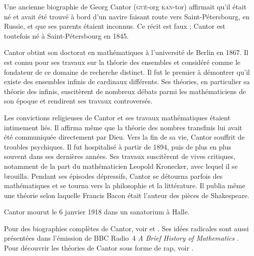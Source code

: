 \documentclass[../../../include/open-logic-section]{subfiles}
\begin{document}



Une ancienne biographie
de Georg Cantor
(\textsc{gué}-org
\textsc{kan}-tor)
affirmait qu'il
était né et
avait été trouvé
à bord d'un
navire faisant
route vers
Saint-Pétersbourg,
en Russie, et
que ses parents
étaient inconnus.
Ce récit est
faux ; Cantor
est toutefois
né à
Saint-Pétersbourg
en 1845.

Cantor obtint
son doctorat
en mathématiques
à l'université
de Berlin
en 1867.
Il est connu
pour ses travaux
sur la théorie
des ensembles
et considéré
comme le fondateur
de ce domaine
de recherche
distinct. Il
fut le premier
à démontrer
qu'il existe
des ensembles
infinis de
cardinaux différents.
Ses théories,
en particulier
sa théorie
des infinis,
suscitèrent
de nombreux
débats parmi
les mathématiciens
de son époque
et rendirent
ses travaux
controversés.

Les convictions
religieuses de
Cantor et ses
travaux mathématiques
étaient intimement
liés. Il affirma
même que la
théorie des
nombres transfinis
lui avait été
communiquée
directement
par Dieu.
Vers la fin
de sa vie,
Cantor souffrit
de troubles
psychiques.
Il fut hospitalisé
à partir de 1894,
puis de plus
en plus souvent
dans ses dernières
années. Ses travaux suscitèrent de vives critiques,
notamment de la part du mathématicien Leopold Kronecker,
avec lequel il se brouilla. Pendant ses épisodes dépressifs,
Cantor se détourna parfois des mathématiques et se tourna
vers la philosophie et la littérature.
Il publia même
une théorie
selon laquelle
Francis Bacon
était l'auteur
des pièces
de Shakespeare.

Cantor mourut
le 6 janvier 1918
dans un sanatorium
à Halle.

\begin{reading}
Pour des biographies
complètes de Cantor,
voir \citet{Dauben1990}
et
\citet{Grattan-Guinness1971}.
Ses idées radicales
sont aussi présentées
dans l'émission de
BBC Radio~4
\emph{A Brief History
of Mathematics}
\citep{Sautoy2014}.
Pour découvrir
les théories
de Cantor sous
forme de rap,
voir \citet{Rose2012}.
\end{reading}
\end{document}
